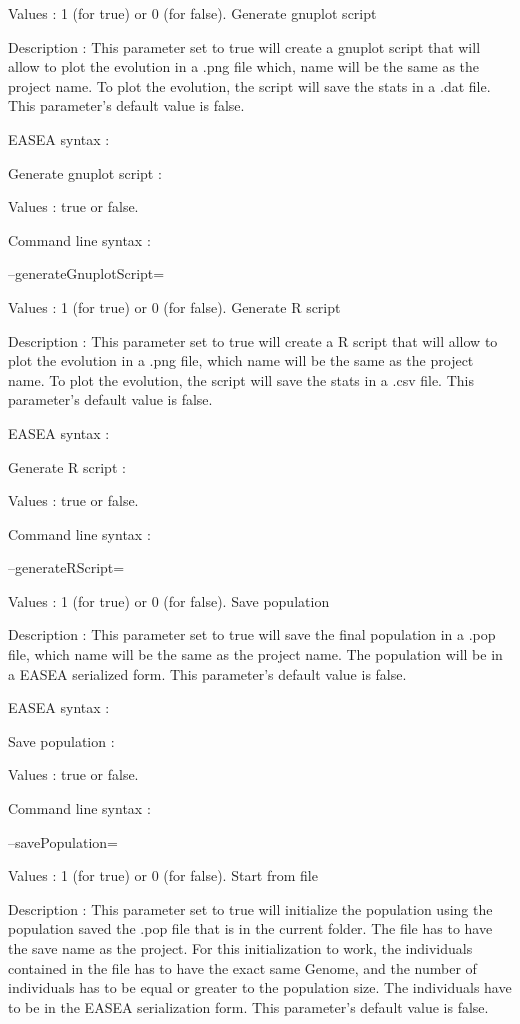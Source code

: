 \documentclass{article}
\begin{document}
Values : 1 (for true) or 0 (for false).
Generate gnuplot script

Description :
This parameter set to true will create a gnuplot script that will allow to plot the evolution in a .png file which, name will be the same as the project name. To plot the evolution, the script will save the stats in a .dat file. This parameter's default value is false.

EASEA syntax :

Generate gnuplot script :

Values : true or false.

Command line syntax :

--generateGnuplotScript=

Values : 1 (for true) or 0 (for false).
Generate R script

Description :
This parameter set to true will create a R script that will allow to plot the evolution in a .png file, which name will be the same as the project name. To plot the evolution, the script will save the stats in a .csv file. This parameter's default value is false.

EASEA syntax :

Generate R script :

Values : true or false.

Command line syntax :

--generateRScript=

Values : 1 (for true) or 0 (for false).
Save population

Description :
This parameter set to true will save the final population in a .pop file, which name will be the same as the project name. The population will be in a EASEA serialized form. This parameter's default value is false.

EASEA syntax :

Save population :

Values : true or false.

Command line syntax :

--savePopulation=

Values : 1 (for true) or 0 (for false).
Start from file

Description :
This parameter set to true will initialize the population using the population saved the .pop file that is in the current folder. The file has to have the save name as the project. For this initialization to work, the individuals contained in the file has to have the exact same Genome, and the number of individuals has to be equal or greater to the population size.
The individuals have to be in the EASEA serialization form.
This parameter's default value is false.
\end{document}
